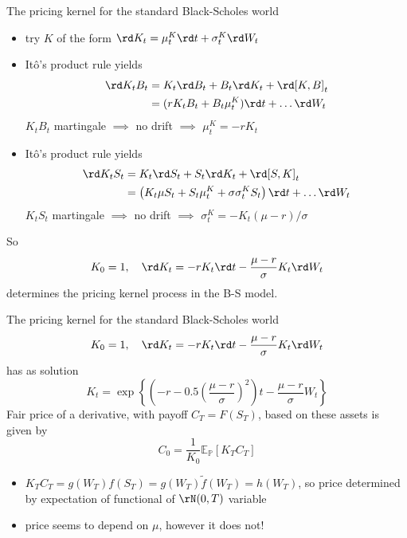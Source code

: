 \documentclass[pdf, handout]{beamer}
\begin{document}
\begin{frame}{The pricing kernel for the standard Black-Scholes world}
\small{
\begin{itemize}
\item try $K$ of the form
$
\rd K_t=\mu^K_t \rd t + \sigma^K_t \rd W_t
$
\item It\^{o}'s product rule yields
\begin{align*}
\rd K_t B_t&=K_t \rd B_t + B_t \rd K_t+ \rd [K,B]_t\\
&=( r K_t B_t + B_t \mu^K_t) \rd t + \ldots \rd W_t
\end{align*}
$K_tB_t$ martingale $\implies$ no drift $\implies$ $\mu^K_t=-rK_t$
\item
It\^{o}'s product rule yields
\begin{align*}
\rd K_t S_t&=K_t \rd S_t + S_t \rd K_t+ \rd [S,K]_t\\
&=\left(  K_t\mu S_t + S_t\mu^K_t+ \sigma \sigma^K_t S_t\right)   \rd t + \ldots \rd W_t
\end{align*}
$K_tS_t$ martingale $\implies$ no drift $\implies$ $\sigma^K_t=-K_t(\mu-r)/\sigma$
\end{itemize}
So
\[
K_0=1,\quad \rd K_t=-rK_t \rd t  -\frac{\mu-r}{\sigma} K_t \rd W_t
\]
determines the pricing kernel process in the B-S model.
}
\end{frame}
%
\begin{frame}{The pricing kernel for the standard Black-Scholes world}
\[
K_0=1,\quad \rd K_t=-rK_t \rd t  -\frac{\mu-r}{\sigma} K_t \rd W_t
\]
has as solution
\[
K_t=\exp\left\{
\left(-r-0.5\left(\frac{\mu-r}{\sigma}\right)^2 \right)t -\frac{\mu-r}{\sigma} W_t
\right\}
\]
Fair price of a derivative, with payoff $C_T=F(S_T)$, based on these assets is given by
\[
C_0=\frac{1}{K_0}\mathbb{E}_{\mathbb{P}}[ K_T C_T ]
\]
\begin{itemize}
\item $K_T C_T=g(W_T)f(S_T)=g(W_T)\tilde f(W_T)=h(W_T)$, so price determined by expectation of functional of $\rN(0,T)$ variable
\item price seems to depend on $\mu$, however it does not!
\end{itemize}
\end{frame}
\end{document}
